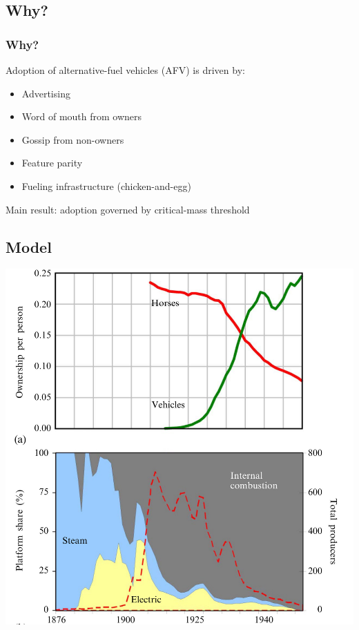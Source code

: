 \documentclass{beamer}
\begin{document}
\subsection{Why?}


\begin{frame}
  \frametitle{Why?}
  Adoption of alternative-fuel vehicles (AFV) is driven by:
  \begin{itemize}
  \item Advertising
  \item Word of mouth from owners
  \item Gossip from non-owners
  \item Feature parity
  \item Fueling infrastructure (chicken-and-egg)
  \end{itemize}
  Main result: adoption governed by critical-mass threshold
\end{frame}

\subsection{Model}

\begin{frame}
  \includegraphics[height=\textheight]{Sterman-fig-1.jpg}
\end{frame}
    
\end{document}
